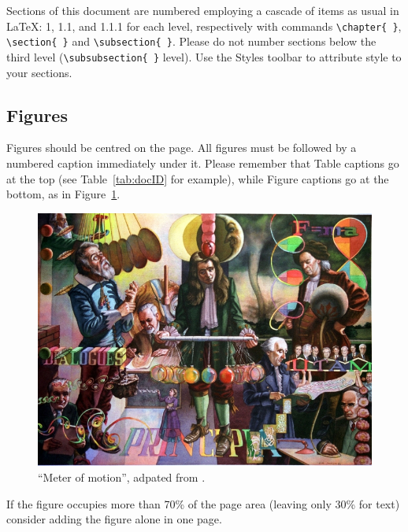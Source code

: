 Sections of this document are numbered employing a cascade of items as usual in \LaTeX: 1, 1.1, and 1.1.1 for each level, respectively with commands \verb+\chapter{ }+, \verb+\section{ }+ and \verb+\subsection{ }+. Please do not number sections below the third level (\verb+\subsubsection{ }+ level). Use the Styles toolbar to attribute style to your sections.

\subsection{Figures}

Figures should be centred on the page. All figures must be followed by a numbered caption immediately under it. Please remember that Table captions go at the top (see Table~\ref{tab:docID} for example), while Figure captions go at the bottom, as in Figure~\ref{fig:example}.

\begin{figure}[ht]
    \centering
    \includegraphics[width=.6\linewidth]{figures/template/Meters_of_Motion}
\caption{``Meter of motion'', adpated from \citep{jackson}.\label{fig:example}}
\end{figure}

If the figure occupies more than 70\% of the page area (leaving only 30\% for text) consider adding the figure alone in one page.

